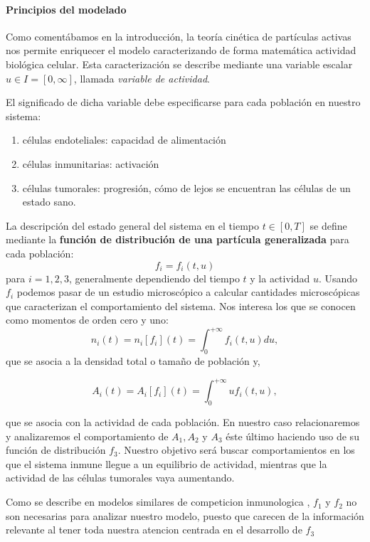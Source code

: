 \documentclass[1p]{elsarticle}
\begin{document}
\paragraph{Principios del modelado}

Como comentábamos en la introducción, la teoría cinética de partículas activas nos permite enriquecer el modelo caracterizando de forma matemática actividad biológica celular. Esta caracterización se describe mediante una variable escalar $u\in I=[0,\infty]$, llamada \textit{variable de actividad}.

El significado de dicha variable debe especificarse para cada población en nuestro sistema:\begin{enumerate}
\item células endoteliales: capacidad de alimentación
\item células inmunitarias: activación 
\item células tumorales: progresión, cómo de lejos se encuentran las células de un estado sano.
\end{enumerate} 
La descripción del estado general del sistema en el tiempo $t\in[0,T]$ se define mediante la \textbf{función de distribución de una partícula generalizada} para cada población:
$$f_i=f_i(t,u)$$
para $i = 1,2,3$, generalmente dependiendo del tiempo $t$ y la actividad $u$.
Usando $f_i$ podemos pasar de un estudio microscópico a calcular cantidades microscópicas que caracterizan el comportamiento del sistema. Nos interesa los que se conocen como momentos de orden cero y uno:
$$
n_i(t)= n_i [f_i] (t) =\int_{0}^{+\infty} f_i (t, u) du,
$$
que se asocia a la densidad total o tamaño de población y,

$$A_i (t) = A_i [f_i] (t) =\int_{0}^{+\infty}uf_i(t,u),$$

que se asocia con la actividad de cada población.
En nuestro caso relacionaremos y analizaremos el comportamiento de $A_1, A_2 $ y $A_3$ éste último haciendo uso de su función de distribución $f_3$. Nuestro objetivo será buscar comportamientos en los que el sistema inmune llegue a un equilibrio de actividad, mientras que la actividad de las células tumorales vaya aumentando.

Como se describe en modelos similares de competicion inmunologica \cite{existencia}, $f_1$ y $f_2$ no son necesarias para analizar nuestro modelo, puesto que carecen de la información relevante al tener toda nuestra atencion centrada en el desarrollo de $f_3$   
\end{document}
